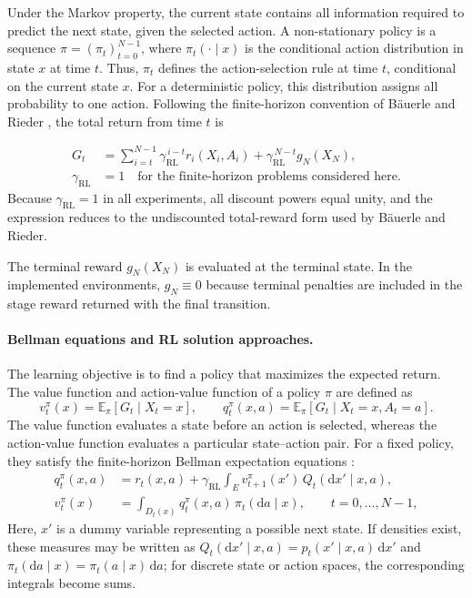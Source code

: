\documentclass[12pt]{article}
\begin{document}
Under the Markov property, the current state contains all information required to predict the next state, given the selected action. A non-stationary policy is a sequence $\pi=(\pi_t)_{t=0}^{N-1}$, where $\pi_t(\cdot\mid x)$ is the conditional action distribution in state $x$ at time $t$. Thus, $\pi_t$ defines the action-selection rule at time $t$, conditional on the current state $x$. For a deterministic policy, this distribution assigns all probability to one action. Following the finite-horizon convention of Bäuerle and Rieder \cite{baeuerle2011markov}, the total return from time $t$ is
\begin{samepage}
\[
\begin{aligned}
G_t & = \sum_{i=t}^{N-1}\gamma_{\mathrm{RL}}^{\,i-t}r_i(X_i,A_i)
      +\gamma_{\mathrm{RL}}^{\,N-t}g_N(X_N),\\
\gamma_{\mathrm{RL}} & = 1 \quad \text{for the finite-horizon problems considered here}.
\end{aligned}
\]
Because $\gamma_{\mathrm{RL}}=1$ in all experiments, all discount powers equal unity, and the expression reduces to the undiscounted total-reward form used by Bäuerle and Rieder.
\end{samepage}
The terminal reward $g_N(X_N)$ is evaluated at the terminal state. In the implemented environments, $g_N\equiv0$ because terminal penalties are included in the stage reward returned with the final transition.

\paragraph{Bellman equations and RL solution approaches.}

The learning objective is to find a policy that maximizes the expected return. The value function and action-value function of a policy $\pi$ are defined as
\[
v_t^\pi(x) = \mathbb{E}_{\pi}\!\left[G_t \mid X_t=x\right],
\qquad
q_t^\pi(x,a) = \mathbb{E}_{\pi}\!\left[G_t \mid X_t=x, A_t=a\right].
\]
The value function evaluates a state before an action is selected, whereas the action-value function evaluates a particular state--action pair. For a fixed policy, they satisfy the finite-horizon Bellman expectation equations \cite{baeuerle2011markov}:
\begin{align}
q_t^\pi(x,a)
&=r_t(x,a)+\gamma_{\mathrm{RL}}
  \int_E v_{t+1}^\pi(x')\,Q_t(\mathrm{d}x'\mid x,a),
  \label{eq:bellman_action_value}\\
v_t^\pi(x)
&=\int_{D_t(x)}q_t^\pi(x,a)\,\pi_t(\mathrm{d}a\mid x),
  \qquad t=0,\ldots,N-1,
  \label{eq:bellman_state_value}
\end{align}
Here, $x'$ is a dummy variable representing a possible next state. If densities exist, these measures may be written as $Q_t(\mathrm{d}x'\mid x,a)=p_t(x'\mid x,a)\,\mathrm{d}x'$ and $\pi_t(\mathrm{d}a\mid x)=\pi_t(a\mid x)\,\mathrm{d}a$; for discrete state or action spaces, the corresponding integrals become sums.
\end{document}
